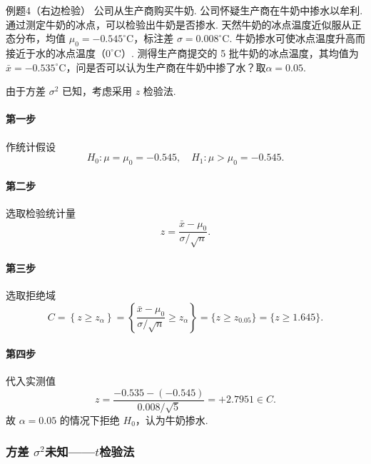 \begin{question}{例题4（右边检验）}
    公司从生产商购买牛奶. 公司怀疑生产商在牛奶中掺水以牟利. 通过测定牛奶的冰点，可以检验出牛奶是否掺水. 天然牛奶的冰点温度近似服从正态分布，均值 $\mu_0=-0.545^\circ\mathrm{C}$，标注差 $\sigma=0.008^\circ\mathrm{C}$. 牛奶掺水可使冰点温度升高而接近于水的冰点温度（$0^\circ\mathrm{C}$）. 测得生产商提交的 5 批牛奶的冰点温度，其均值为 $\bar{x}=-0.535^\circ\mathrm{C}$，问是否可以认为生产商在牛奶中掺了水？取$\alpha=0.05$.
\end{question}
\begin{solution}
    由于方差 $\sigma^2$ 已知，考虑采用 $z$ 检验法.
    \paragraph{第一步} 作统计假设
    $$
        H_0: \mu=\mu_0=-0.545, \quad H_1: \mu>\mu_0=-0.545.
    $$
    \paragraph{第二步} 选取检验统计量
    $$
        z = \frac{\bar{x}-\mu_0}{\sigma/\sqrt{n}} .
    $$
    \paragraph{第三步} 选取拒绝域
    $$
        C = \left\{z \geqslant z_{\alpha}\right\}
        = \left\{\frac{\bar{x}-\mu_0}{\sigma/\sqrt{n}} \geqslant z_{\alpha}\right\}
        = \{z \geqslant z_{0.05}\}
        = \{z \geqslant 1.645\}.
    $$
    \paragraph{第四步} 代入实测值
    $$
        z = \frac{-0.535-(-0.545)}{0.008/\sqrt{5}} = +2.7951 \in C.
    $$
    故 $\alpha = 0.05$ 的情况下拒绝 $H_0$，认为牛奶掺水.
\end{solution}


\subsubsection{方差 \texorpdfstring{$\sigma^2$}{σ²}未知——\texorpdfstring{$t$}{t}检验法}

